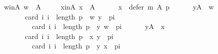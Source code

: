 \begin{isabellebody}
\ \ \ \ w{\isacharunderscore}{\kern0pt}in{\isacharunderscore}{\kern0pt}A{\isacharcolon}{\kern0pt}\ {\isachardoublequoteopen}w\ {\isasymin}\ A{\isachardoublequoteclose}\ \isanewline
\ \ \ \ x{\isacharunderscore}{\kern0pt}in{\isacharunderscore}{\kern0pt}A{\isacharcolon}{\kern0pt}\ {\isachardoublequoteopen}x\ {\isasymin}\ A{\isachardoublequoteclose}\ \isanewline
\ \ \ \ {}{\isacharcolon}{\kern0pt}\ {\isachardoublequoteopen}x\ {\isasymnotin}\ defer\ m\ A\ p{\isachardoublequoteclose}\ \isanewline
\ \ \ \ {}{\isacharcolon}{\kern0pt}\ {\isachardoublequoteopen}{\isasymforall}y{\isasymin}A\ {\isacharminus}{\kern0pt}\ {\isacharbraceleft}{\kern0pt}w{\isacharbraceright}{\kern0pt}{\isachardot}{\kern0pt}\isanewline
\ \ \ \ \ \ \ \ \ \ card\ {\isacharbraceleft}{\kern0pt}i{\isachardot}{\kern0pt}\ i\ {\isacharless}{\kern0pt}\ length\ p\ {\isasymand}\ {\isacharparenleft}{\kern0pt}w{\isacharcomma}{\kern0pt}\ y{\isacharparenright}{\kern0pt}\ {\isasymin}\ {\isacharparenleft}{\kern0pt}p{\isacharbang}{\kern0pt}i{\isacharparenright}{\kern0pt}{\isacharbraceright}{\kern0pt}\ {\isacharless}{\kern0pt}\isanewline
\ \ \ \ \ \ \ \ \ \ \ \ card\ {\isacharbraceleft}{\kern0pt}i{\isachardot}{\kern0pt}\ i\ {\isacharless}{\kern0pt}\ length\ p\ {\isasymand}\ {\isacharparenleft}{\kern0pt}y{\isacharcomma}{\kern0pt}\ w{\isacharparenright}{\kern0pt}\ {\isasymin}\ {\isacharparenleft}{\kern0pt}p{\isacharbang}{\kern0pt}i{\isacharparenright}{\kern0pt}{\isacharbraceright}{\kern0pt}{\isachardoublequoteclose}\ \isanewline
\ \ \ \ {}{\isacharcolon}{\kern0pt}\ {\isachardoublequoteopen}{\isasymforall}y{\isasymin}A\ {\isacharminus}{\kern0pt}\ {\isacharbraceleft}{\kern0pt}x{\isacharbraceright}{\kern0pt}{\isachardot}{\kern0pt}\isanewline
\ \ \ \ \ \ \ \ \ \ card\ {\isacharbraceleft}{\kern0pt}i{\isachardot}{\kern0pt}\ i\ {\isacharless}{\kern0pt}\ length\ p\ {\isasymand}\ {\isacharparenleft}{\kern0pt}x{\isacharcomma}{\kern0pt}\ y{\isacharparenright}{\kern0pt}\ {\isasymin}\ {\isacharparenleft}{\kern0pt}p{\isacharbang}{\kern0pt}i{\isacharparenright}{\kern0pt}{\isacharbraceright}{\kern0pt}\ {\isacharless}{\kern0pt}\isanewline
\ \ \ \ \ \ \ \ \ \ \ \ card\ {\isacharbraceleft}{\kern0pt}i{\isachardot}{\kern0pt}\ i\ {\isacharless}{\kern0pt}\ length\ p\ {\isasymand}\ {\isacharparenleft}{\kern0pt}y{\isacharcomma}{\kern0pt}\ x{\isacharparenright}{\kern0pt}\ {\isasymin}\ {\isacharparenleft}{\kern0pt}p{\isacharbang}{\kern0pt}i{\isacharparenright}{\kern0pt}{\isacharbraceright}{\kern0pt}{\isachardoublequoteclose}\isanewline
\ \ \isamarkupfalse%

\end{isabellebody}
